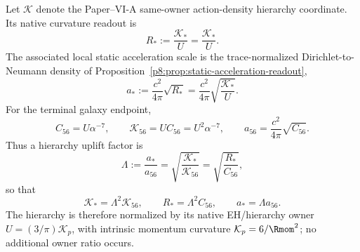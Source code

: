 \documentclass[12pt,a4paper]{article}
\begin{document}
\begin{definition}
\label{p8:def:planck-normalized-hierarchy-readout}
Let \(\mathcal K\) denote the Paper--VI-A same-owner action-density hierarchy
coordinate.  Its native curvature readout is
\begin{equation}
\label{p8:eq:K-to-R-readout}
    R_*:=\frac{\mathcal K_*}{U}
    =\frac{\mathcal K_*}{U}.
\end{equation}
The associated local static acceleration scale is the trace-normalized
Dirichlet-to-Neumann density of Proposition~\ref{p8:prop:static-acceleration-readout},
\begin{equation}
\label{p8:eq:K-to-a-readout}
    a_*:=\frac{c^2}{4\pi}\sqrt{R_*}
    =\frac{c^2}{4\pi}\sqrt{\frac{\mathcal K_*}{U}}.
\end{equation}
For the terminal galaxy endpoint,
\begin{equation}
\label{p8:eq:K56-readout}
    C_{56}=U\alpha^{-7},
    \qquad
    \mathcal K_{56}=U C_{56}=U^2\alpha^{-7},
    \qquad
    a_{56}=\frac{c^2}{4\pi}\sqrt{C_{56}}.
\end{equation}
Thus a hierarchy uplift factor is
\begin{equation}
\label{p8:eq:Lambda-uplift-definition}
    \Lambda:=\frac{a_*}{a_{56}}
    =\sqrt{\frac{\mathcal K_*}{\mathcal K_{56}}}
    =\sqrt{\frac{R_*}{C_{56}}},
\end{equation}
so that
\begin{equation}
\label{p8:eq:uplift-readout-chain}
    \mathcal K_* = \Lambda^2\mathcal K_{56},
    \qquad
    R_* = \Lambda^2 C_{56},
    \qquad
    a_* = \Lambda a_{56}.
\end{equation}
The hierarchy is therefore normalized by its native EH/hierarchy owner \(U=(3/\pi)\mathcal K_p\), with intrinsic momentum curvature \(\mathcal K_p=6/\Rmom^2\); no additional owner ratio occurs.
\end{definition}
\end{document}
